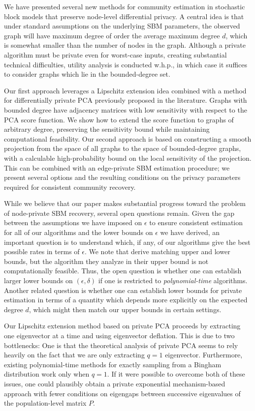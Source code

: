 \documentclass{article}
\begin{document}
We have presented several new methods for community estimation in stochastic block models that preserve node-level differential privacy. A central idea is that under standard assumptions on the underlying SBM parameters, the observed graph will have maximum degree of order the average maximum degree $d$, which is somewhat smaller than the number of nodes in the graph. Although a private algorithm must be private even for worst-case inputs, creating substantial technical difficulties, utility analysis is conducted w.h.p., in which case it suffices to consider graphs which lie in the bounded-degree set.

Our first approach leverages a Lipschitz extension idea combined with a method for differentially private PCA previously proposed in the literature. Graphs with bounded degree have adjacency matrices with low sensitivity with respect to the PCA score function. We show how to extend the score function to graphs of arbitrary degree, preserving the sensitivity bound while maintaining computational feasibility. Our second approach is based on constructing a smooth projection from the space of all graphs to the space of bounded-degree graphs, with a calculable high-probability bound on the local sensitivity of the projection. This can be combined with an edge-private SBM estimation procedure; we present several options and the resulting conditions on the privacy parameters required for consistent community recovery.

While we believe that our paper makes substantial progress toward the problem of node-private SBM recovery, several open questions remain. Given the gap between the assumptions we have imposed on $\epsilon$ to ensure consistent estimation for all of our algorithms and the lower bounds on $\epsilon$ we have derived, an important question is to understand which, if any, of our algorithms give the best possible rates in terms of $\epsilon$. We note that \cite{klopp2026node} derive matching upper and lower bounds, but the algorithm they analyze in their upper bound is not computationally feasible. Thus, the open question is whether one can establish larger lower bounds on $(\epsilon, \delta)$ if one is restricted to \emph{polynomial-time} algorithms. Another related question is whether one can establish lower bounds for private estimation in terms of a quantity which depends more explicitly on the expected degree $d$, which might then match our upper bounds in certain settings.

Our Lipschitz extension method based on private PCA proceeds by extracting one eigenvector at a time and using eigenvector deflation. This is due to two bottlenecks: One is that the theoretical analysis of private PCA seems to rely heavily on the fact that we are only extracting $q=1$ eigenvector. Furthermore, existing polynomial-time methods for exactly sampling from a Bingham distribution work only when $q=1$. If it were possible to overcome both of these issues, one could plausibly obtain a private exponential mechanism-based approach with fewer conditions on eigengaps between successive eigenvalues of the population-level matrix $P$.
\end{document}
